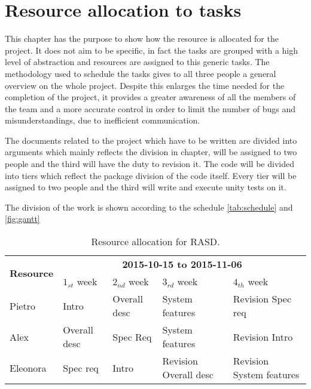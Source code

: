 \chapter{Resource allocation to tasks}
\label{chap:resource-allocation}

This chapter has the purpose to show how the resource is allocated for the project. It does not aim to be specific, in fact the tasks are grouped with a high level of abstraction and resources are assigned to this generic tasks.
The methodology used to schedule the tasks gives to all three people a general overview on the whole project. 
Despite this enlarges the time needed for the completion of the project, it provides a greater awareness of all the members of the team and a more accurate control in order to limit the number of bugs and misunderstandings, due to inefficient communication. 

The documents related to the project which have to be written are divided into arguments which mainly reflects the division in chapter, will be assigned to two people and the third will have the duty to revision it. 
The code will be divided into tiers which reflect the package division of the code itself. Every tier will be assigned to two people and the third will write and execute unity tests on it.

The division of the work is shown  according to the schedule \autoref{tab:schedule} and \autoref{fig:gantt}


\begin{table}[h]
    \centering
    \begin{tabular}{| l | l | l | l | l |}
        \hline
        \multirow{2}{*}{\textbf{Resource}} & \multicolumn{4}{c|}{\textbf{2015-10-15 to 2015-11-06}} \\
        \cline{2-5}
        & $1_{st}$ week & $2_{nd}$ week & $3_{rd} $ week & $4_{th}$ week\\
        \hline
        Pietro        & Intro    & Overall desc     & System features & Revision Spec req    \\
        Alex         & Overall desc     & Spec Req     & System features & Revision Intro   \\
        Eleonora        & Spec req     & Intro     & Revision Overall desc &    Revision System features  \\
        \hline
    \end{tabular}
    \caption{Resource allocation for RASD.}
    \label{tab:rasd-alloc}
\end{table}


